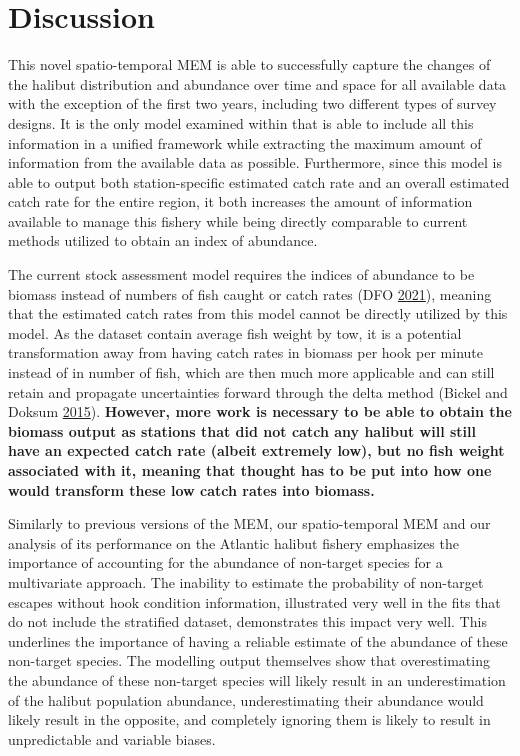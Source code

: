 \documentclass[12pt]{article}\usepackage[]{graphicx}\usepackage[]{color}
\begin{document}
\hypertarget{discussion}{%
\section{Discussion}\label{discussion}}

This novel spatio-temporal MEM is able to successfully capture the changes of the halibut distribution and abundance over time and space for all available data with the exception of the first two years, including two different types of survey designs. It is the only model examined within that is able to include all this information in a unified framework while extracting the maximum amount of information from the available data as possible. Furthermore, since this model is able to output both station-specific estimated catch rate and an overall estimated catch rate for the entire region, it both increases the amount of information available to manage this fishery while being directly comparable to current methods utilized to obtain an index of abundance.

The current stock assessment model requires the indices of abundance to be biomass instead of numbers of fish caught or catch rates (DFO \protect\hyperlink{ref-DFO2021}{2021}), meaning that the estimated catch rates from this model cannot be directly utilized by this model. As the dataset contain average fish weight by tow, it is a potential transformation away from having catch rates in biomass per hook per minute instead of in number of fish, which are then much more applicable and can still retain and propagate uncertainties forward through the delta method (Bickel and Doksum \protect\hyperlink{ref-Bickel2015}{2015}). \textbf{However, more work is necessary to be able to obtain the biomass output as stations that did not catch any halibut will still have an expected catch rate (albeit extremely low), but no fish weight associated with it, meaning that thought has to be put into how one would transform these low catch rates into biomass.}

Similarly to previous versions of the MEM, our spatio-temporal MEM and our analysis of its performance on the Atlantic halibut fishery emphasizes the importance of accounting for the abundance of non-target species for a multivariate approach. The inability to estimate the probability of non-target escapes without hook condition information, illustrated very well in the fits that do not include the stratified dataset, demonstrates this impact very well. This underlines the importance of having a reliable estimate of the abundance of these non-target species. The modelling output themselves show that overestimating the abundance of these non-target species will likely result in an underestimation of the halibut population abundance, underestimating their abundance would likely result in the opposite, and completely ignoring them is likely to result in unpredictable and variable biases.
\end{document}
